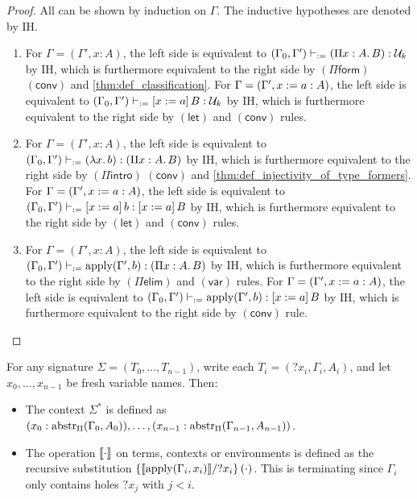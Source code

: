 \documentclass[twoside]{report}
\begin{document}
\begin{proof}
All can be shown by induction on $\Gamma$. The inductive hypotheses are denoted by IH.
\begin{enumerate}

    \item For $\Gamma = (\Gamma', x : A)$, the left side is equivalent to $(\Gamma_0, \Gamma') \vdashd (\ppi x A B) : \mathcal U_k$ by IH, which is furthermore equivalent to the right side by $(\Pi\mathsf{form})$ $(\mathsf{conv})$ and \cref{thm:def_classification}. For $\Gamma = (\Gamma', x \defeq a : A)$, the left side is equivalent to $(\Gamma_0, \Gamma') \vdashd \llet x a B : \mathcal U_k$ by IH, which is furthermore equivalent to the right side by $(\mathsf{let})$ and $(\mathsf{conv})$ rules.

    \item For $\Gamma = (\Gamma', x : A)$, the left side is equivalent to $(\Gamma_0, \Gamma') \vdashd (\lam x b) : (\ppi x A B)$ by IH, which is furthermore equivalent to the right side by $(\Pi\mathsf{intro})$ $(\mathsf{conv})$ and \cref{thm:def_injectivity_of_type_formers}. For $\Gamma = (\Gamma', x \defeq a : A)$, the left side is equivalent to $(\Gamma_0, \Gamma') \vdashd \llet x a b : \llet x a B$ by IH, which is furthermore equivalent to the right side by $(\mathsf{let})$ and $(\mathsf{conv})$ rules.

    \item For $\Gamma = (\Gamma', x : A)$, the left side is equivalent to $(\Gamma_0, \Gamma') \vdashd \apply(\Gamma', b) : (\ppi x A B)$ by IH, which is furthermore equivalent to the right side by $(\Pi\mathsf{elim})$ and $(\mathsf{var})$ rules. For $\Gamma = (\Gamma', x \defeq a : A)$, the left side is equivalent to $(\Gamma_0, \Gamma') \vdashd \apply(\Gamma', b) : \llet x a B$ by IH, which is furthermore equivalent to the right side by $(\mathsf{conv})$ rule. \qedhere
\end{enumerate}
\end{proof}

\begin{definition}
\label{def:hole_signature_interpretations}
For any signature $\Sigma = (T_0, \ldots, T_{n-1})$, write each $T_i = ({?x_i}, \Gamma_i, A_i)$, and let $x_0, \ldots, x_{n-1}$ be fresh variable names. Then:
\begin{itemize}[noitemsep]
    \item The context $\Sigma^\ast$ is defined as $(x_0 : \abstr_\Pi(\Gamma_0, A_0)), \ldots, (x_{n-1} : \abstr_\Pi(\Gamma_{n-1}, A_{n-1}))$.
    \item The operation $\inter\cdot$ on terms, contexts or environments is defined as the recursive substitution $\subst {?x_i} {\inter{\apply(\Gamma_i, x_i)}} {(\cdot)}$. This is terminating since $\Gamma_i$ only contains holes $?x_j$ with $j < i$.
\end{itemize}
\end{definition}
\end{document}
